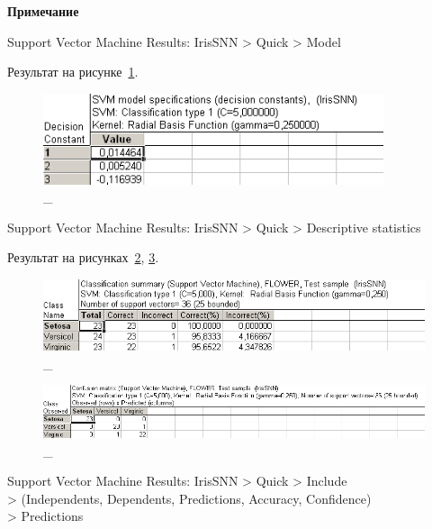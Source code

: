 \newpage

\begin{center}
  \textbf{Примечание}
\end{center}

Support Vector Machine Results: IrisSNN > Quick > Model

Результат на рисунке~\ref{fig:14}.

\begin{figure}[!h]
  \centering

  \includegraphics[width=10cm]
  {inc/ex_14.PNG}

  \caption{\_}

  \label{fig:14}
\end{figure}

Support Vector Machine Results: IrisSNN > Quick > Descriptive statistics

Результат на рисунках~\ref{fig:15_1}, \ref{fig:15_2}.

\begin{figure}[!h]
  \centering

  \includegraphics[width=14cm]
  {inc/ex_15_2.PNG}

  \caption{\_}

  \label{fig:15_1}
\end{figure}

\begin{figure}[!h]
  \centering

  \includegraphics[width=14cm]
  {inc/ex_15.PNG}

  \caption{\_}

  \label{fig:15_2}
\end{figure}

Support Vector Machine Results: IrisSNN > Quick > Include \\
> (Independents, Dependents, Predictions, Accuracy, Confidence) \\
> Predictions

